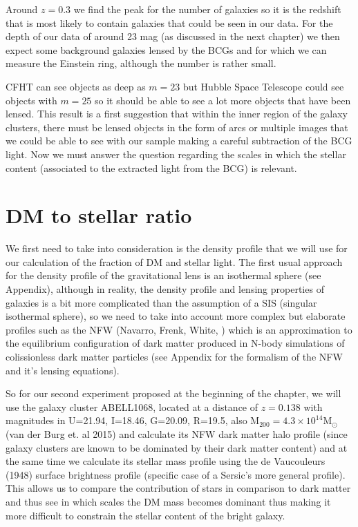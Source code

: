 Around $z=0.3$ we find the peak for the number of galaxies so it is the redshift that is most likely to contain galaxies that could be seen in our data. For the depth of our data of around 23 mag (as discussed in the next chapter) we then expect some background galaxies lensed by the BCGs and for which we can measure the Einstein ring, although the number is rather small. 

CFHT can see objects as deep as $m=23$ but Hubble Space Telescope could see objects with $m=25$ so it should be able to see a lot more objects that have been lensed. This result is a first suggestion that within the inner region of the galaxy clusters, there must be lensed objects in the form of arcs or multiple images that we could be able to see with our sample making a careful subtraction of the BCG light. Now we must answer the question regarding the scales in which the stellar content (associated to the extracted light from the BCG) is relevant.

\section{DM to stellar ratio}

We first need to take into consideration is the density profile that we will use for our calculation of the fraction of DM and stellar light. The first usual approach for the density profile of the gravitational lens is an isothermal sphere (see Appendix), although in reality, the density profile and lensing properties of galaxies is a bit more complicated than the assumption of a SIS (singular isothermal sphere), so we need to take into account more complex but elaborate profiles such as the NFW (Navarro, Frenk, White, \citeyear{Reference17}) which is an approximation to the equilibrium configuration of dark matter produced in N-body simulations of colissionless dark matter particles (see Appendix for the formalism of the NFW and it's lensing equations).

So for our second experiment proposed at the beginning of the chapter, we will use the galaxy cluster ABELL1068, located at a distance of $z=0.138$ with magnitudes in U=21.94, I=18.46, G=20.09, R=19.5, also $\text{M}_{200}=4.3\times 10^{14}\text{M}_{\odot}$ (van der Burg et. al 2015) and calculate its NFW dark matter halo profile (since galaxy clusters are known to be dominated by their dark matter content) and at the same time we calculate its stellar mass profile using the de Vaucouleurs (1948) surface brightness profile (specific case of a Sersic's more general profile). This allows us to compare the contribution of stars in comparison to dark matter and thus see in which scales the DM mass becomes dominant thus making it more difficult to constrain the stellar content of the bright galaxy.

